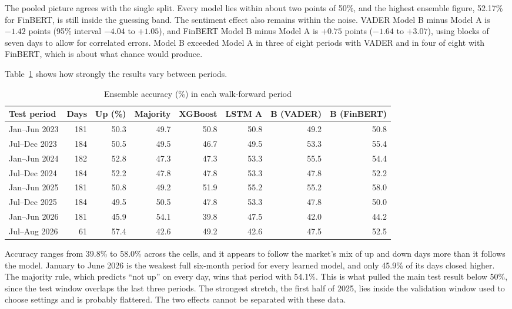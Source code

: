 The pooled picture agrees with the single split. Every model lies within about two points of 50\%, and the highest ensemble figure, 52.17\% for FinBERT, is still inside the guessing band. The sentiment effect also remains within the noise. VADER Model B minus Model A is $-1.42$ points (95\% interval $-4.04$ to $+1.05$), and FinBERT Model B minus Model A is $+0.75$ points ($-1.64$ to $+3.07$), using blocks of seven days to allow for correlated errors. Model B exceeded Model A in three of eight periods with VADER and in four of eight with FinBERT, which is about what chance would produce.

Table~\ref{tab:wffolds} shows how strongly the results vary between periods.

\begin{table}[htbp]\centering\small
\caption{Ensemble accuracy (\%) in each walk-forward period}\label{tab:wffolds}
\begin{tabularx}{\textwidth}{lrrrrrrr}
\toprule
Test period & Days & Up (\%) & Majority & XGBoost & LSTM A & B (VADER) & B (FinBERT)\\\midrule
Jan--Jun 2023 & 181 & 50.3 & 49.7 & 50.8 & 50.8 & 49.2 & 50.8\\
Jul--Dec 2023 & 184 & 50.5 & 49.5 & 46.7 & 49.5 & 53.3 & 55.4\\
Jan--Jun 2024 & 182 & 52.8 & 47.3 & 47.3 & 53.3 & 55.5 & 54.4\\
Jul--Dec 2024 & 184 & 52.2 & 47.8 & 47.8 & 53.3 & 47.8 & 52.2\\
Jan--Jun 2025 & 181 & 50.8 & 49.2 & 51.9 & 55.2 & 55.2 & 58.0\\
Jul--Dec 2025 & 184 & 49.5 & 50.5 & 47.8 & 53.3 & 47.8 & 50.0\\
Jan--Jun 2026 & 181 & 45.9 & 54.1 & 39.8 & 47.5 & 42.0 & 44.2\\
Jul--Aug 2026 & 61 & 57.4 & 42.6 & 49.2 & 42.6 & 47.5 & 52.5\\
\bottomrule
\end{tabularx}
\end{table}

Accuracy ranges from 39.8\% to 58.0\% across the cells, and it appears to follow the market's mix of up and down days more than it follows the model. January to June 2026 is the weakest full six-month period for every learned model, and only 45.9\% of its days closed higher. The majority rule, which predicts ``not up'' on every day, wins that period with 54.1\%. This is what pulled the main test result below 50\%, since the test window overlaps the last three periods. The strongest stretch, the first half of 2025, lies inside the validation window used to choose settings and is probably flattered. The two effects cannot be separated with these data.

